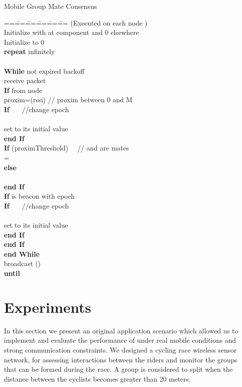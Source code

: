 \documentclass{sig-alternate}
\begin{document}
\begin{algorithm}
\label{algo3}
{\sc Mobile Group Mate Consensus}
\begin{tabbing}
==\= ==\= ==\= ==\= ==\= ==\kill
(Executed on each node )\+ \\
Initialize  with  at component  and 0 elsewhere\\
Initialize  to 0\\
{\bf repeat} infinitely\+\\
\\
{\bf While}  not expired backoff  \+ \\
receive packet \\
{\bf If}  from node  \+\\
proxim=({\sc rssi})  // proxim between 0 and M\\
{\bf If} \+ \ \ \ //change epoch\\
\\
set  to its initial value \-\\
{\bf end If}\\
{\bf If} (proximThreshold)  \ \ // and  are mates\+ \\
=\-\\
{\bf else} \+\\
\- \\

{\bf end If}\-\\
{\bf If}  is beacon with epoch \+\\
{\bf If} \+ \ \ \ //change epoch\\
\\
set  to its initial value \-\\
{\bf end If}\-\\
{\bf end If}\-\\
{\bf end While}\\
broadcast ()\-\\
{\bf until}  \\
\end{tabbing}
\end{algorithm}

\section{Experiments}
\label{sec-Exp}
In this section we present an original application scenario which allowed us to implement and evaluate the performance of {\mgmc} under real mobile conditions and strong communication constraints. We designed a cycling race wireless sensor network, for assessing interactions between the riders and monitor the groups that can be formed during the race. A group is considered to split when the distance between the cyclists becomes greater than 20 meters.
\end{document}

